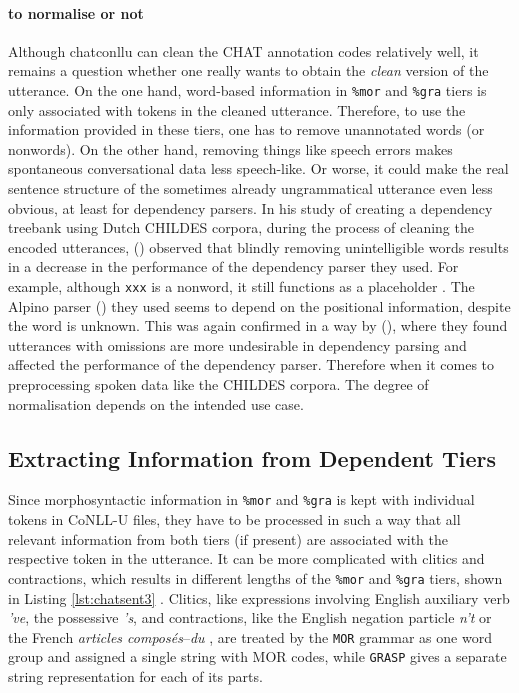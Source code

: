 \paragraph{to normalise or not} Although chatconllu can clean the CHAT annotation codes relatively well, it remains a question whether one really wants to obtain the \emph{clean} version of the utterance. On the one hand, word-based information in \texttt{\%mor} and \texttt{\%gra} tiers is only associated with tokens in the cleaned utterance. Therefore, to use the information provided in these tiers, one has to remove unannotated words (or nonwords). On the other hand, removing things like speech errors makes spontaneous conversational data less speech-like. Or worse, it could make the real sentence structure of the sometimes already ungrammatical utterance even less obvious, at least for dependency parsers. In his study of creating a dependency treebank using Dutch CHILDES corpora, during the process of cleaning the encoded utterances, (\cite{odijk2018anncor}) observed that blindly removing unintelligible words results in a decrease in the performance of the dependency parser they used. For example, although \texttt{xxx} is a nonword, it still functions as a placeholder . The Alpino parser (\cite{bouma}) they used seems to depend on the positional information, despite the word is unknown. This was again confirmed in a way by (\cite{liu2021}), where they found utterances with omissions are more undesirable in dependency parsing and affected the performance of the dependency parser. Therefore when it comes to preprocessing spoken data like the CHILDES corpora. The degree of normalisation depends on the intended use case.

\subsection{Extracting Information from Dependent Tiers}

Since morphosyntactic information in \texttt{\%mor} and \texttt{\%gra} is kept with individual tokens in CoNLL-U files, they have to be processed in such a way that all relevant information from both tiers (if present) are associated with the respective token in the utterance. It can be more complicated with clitics and contractions, which results in different lengths of the \texttt{\%mor} and \texttt{\%gra} tiers, shown in Listing \ref{lst:chatsent3} . Clitics, like expressions involving English auxiliary verb \emph{'ve}, the possessive \emph{'s}, and contractions, like the English negation particle \emph{n't} or the French \emph{articles composés}--\emph{du} , are treated by the \texttt{MOR} grammar as one word group and assigned a single string with MOR codes, while \texttt{GRASP} gives a separate string representation for each of its parts.\\

